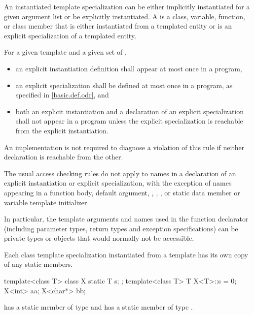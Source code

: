 \pnum
An instantiated template specialization can be either implicitly
instantiated for a given argument list or be explicitly
instantiated.
A  is a class, variable, function, or class member that is either
instantiated from a templated entity or is an
explicit specialization of a templated entity.

\pnum
For a given template and a given set of
,
\begin{itemize}
\item
an explicit instantiation definition shall appear at most once in a program,
\item
an explicit specialization shall be defined at most once
in a program, as specified in \ref{basic.def.odr}, and
\item
both an explicit instantiation and a declaration of an
explicit specialization shall not appear in a program unless
the explicit specialization is reachable from the explicit instantiation.
\end{itemize}
An implementation is not required to diagnose a violation of this rule
if neither declaration is reachable from the other.

\pnum
The usual access checking rules do not apply to names
in a declaration of an explicit instantiation or explicit specialization,
with the exception of names appearing in a function body,
default argument, , , ,
or static data member or variable template initializer.
\begin{note}
In particular, the template arguments and names
used in the function declarator
(including parameter types, return types and exception specifications)
can be private types or objects that would normally not be accessible.
\end{note}

\pnum
Each class template specialization instantiated from a template has its own
copy of any static members.
\begin{example}
\begin{codeblock}
template<class T> class X {
  static T s;
};
template<class T> T X<T>::s = 0;
X<int> aa;
X<char*> bb;
\end{codeblock}

has a static member
of type
and
has a static member
of type
.
\end{example}

